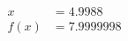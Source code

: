 \documentclass[preview]{standalone}
\begin{document}
\begin{align*}
x &= 4.9988\\f(x) &= 7.9999998
\end{align*}
\end{document}
